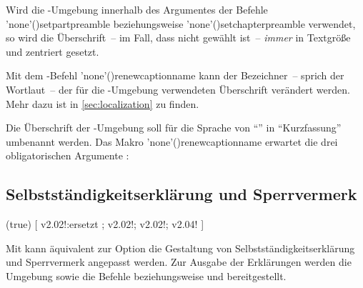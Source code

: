 \begin{DeclareEntity*}{}
\begin{DeclareEntity*}{}
\begin{DeclareEntity*}{}
\begin{Declaration}
\begin{Declaration}
\begin{Declaration}
\begin{Declaration}
\begin{Declaration}
\begin{Declaration}
\begin{Declaration}
Wird die -Umgebung innerhalb des Argumentes der Befehle 
\Macro'none'(){setpartpreamble} beziehungsweise 
\Macro'none'(){setchapterpreamble} verwendet, so wird die 
Überschrift~-- im Fall, dass nicht  gewählt ist~-- 
\emph{immer} in Textgröße und zentriert gesetzt.
\end{Declaration}
\end{Declaration}
\end{Declaration}
\end{Declaration}
\end{Declaration}
\end{Declaration}
\end{Declaration}



Mit dem \KOMAScript-Befehl \Macro'none'(){renewcaptionname}
kann der Bezeichner~-- sprich der Wortlaut~-- der für die 
-Umgebung verwendeten Überschrift verändert werden. Mehr 
dazu ist in \autoref{sec:localization} zu finden.
%
\begin{Example}
Die Überschrift der -Umgebung soll für die Sprache 
 von \enquote{\abstractname} in \enquote{Kurzfassung} umbenannt 
werden. Das Makro \Macro'none'(){renewcaptionname} 
erwartet die drei obligatorischen Argumente 
:
\begin{Code}
\end{Code}
\end{Example}
%



\subsection{%
  Selbstständigkeitserklärung und Sperrvermerk%
}

\begin{Declaration}
  {}
  (true)
[%
  v2.02!:ersetzt ;%
  v2.02!;%
  v2.02!;%
  v2.04!%
]
\printdeclarationlist

Mit  kann äquivalent zur Option  die 
Gestaltung von Selbstständigkeitserklärung und Sperrvermerk angepasst werden.
Zur Ausgabe der Erklärungen werden die Umgebung  
sowie die Befehle  beziehungsweise  und 
 bereitgestellt. 


\end{Declaration}
\end{DeclareEntity*}
\end{DeclareEntity*}
\end{DeclareEntity*}
